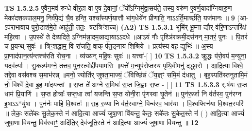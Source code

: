 \documentclass[17pt]{extarticle}
\begin{document}
                  \newline
                                \textbf{ TS 1.5.2.5} \newline
                  ए॒वैन॒मव॑ रुन्धे वीर॒हा वा ए॒ष दे॒वानां॒ ॅयो᳚ऽग्निमु॑द्वा॒सय॑ते॒ तस्य॒ वरु॑ण ए॒वर्ण॒यादा᳚ग्निवारु॒ण-मेका॑दशकपाल॒मनु॒ निर्व॑पे॒द्यं चै॒व हन्ति॒ यश्चा᳚स्यर्ण॒यात्तौ भा॑ग॒धेये॑न प्रीणाति॒ नाऽऽर्ति॒मार्च्छ॑ति॒ यज॑मानः ॥ \textbf{  9} \newline
                  \newline
                      (आ-ऽप॑राभावाय-पुरो॒डाश॑मे॒ते-आहु॑ती॒-ततः॒ -षटत्रिꣳ॑शच्च)  \textbf{(A2)} \newline \newline
                                        \textbf{ TS 1.5.3.1} \newline
                  भूमि॑र् भू॒म्ना द्यौर् व॑रि॒णाऽन्तरि॑क्षं महि॒त्वा । उ॒पस्थे॑ ते देव्यदिते॒ ऽग्निम॑न्ना॒दम॒न्नाद्या॒याऽऽद॑धे ॥आऽयं गौः पृश्ञि॑रक्रमी॒दस॑नन् मा॒तरं॒ पुनः॑ । पि॒तरं॑ च प्र॒यन्थ् सुवः॑ ॥ त्रिꣳ॒॒शद्धाम॒ वि रा॑जति॒ वाक् प॑त॒ङ्गाय॑ शिश्रिये । प्रत्य॑स्य वह॒ द्युभिः॑ ॥ अ॒स्य प्रा॒णाद॑पान॒त्य॑न्तश्च॑रति रोच॒ना । व्य॑ख्यन् महि॒षः सुवः॑ ॥ यत्त्वा᳚-[ ] \textbf{  10} \newline
                  \newline
                                \textbf{ TS 1.5.3.2} \newline
                  क्रु॒द्धः प॑रो॒वप॑ म॒न्युना॒ यदव॑र्त्या । सु॒कल्प॑मग्ने॒ तत्तव॒ पुन॒स्त्वोद्दी॑पयामसि ॥यत्ते॑ म॒न्युप॑रोप्तस्य पृथि॒वीमनु॑ दद्ध्व॒से । आ॒दि॒त्या विश्वे॒ तद्दे॒वा वस॑वश्च स॒माभ॑रन्न् ॥मनो॒ ज्योति॑र् जुषता॒माज्यं॒ ॅविच्छि॑न्नं ॅय॒ज्ञ्ꣳ समि॒मं द॑धातु । बृह॒स्पति॑स्तनुतामि॒मं नो॒ विश्वे॑ दे॒वा इ॒ह मा॑दयन्तां ॥ स॒प्त ते॑ अग्ने स॒मिधः॑ स॒प्त जि॒ह्वाः स॒प्त - [ ] \textbf{  11} \newline
                  \newline
                                \textbf{ TS 1.5.3.3} \newline
                  र्.ष॑यः स॒प्त धाम॑ प्रि॒याणि॑ । स॒प्त होत्राः᳚ सप्त॒धा त्वा॑ यजन्ति स॒प्त योनी॒रा पृ॑णस्वा घृ॒तेन॑ ॥ पुन॑रू॒र्जा नि व॑र्तस्व॒ पुन॑रग्न इ॒षाऽऽ*यु॑षा । पुन॑र्नः पाहि वि॒श्वतः॑ ॥ स॒ह र॒य्या नि व॑र्त॒स्वाग्ने॒ पिन्व॑स्व॒ धार॑या । वि॒श्वफ्स्नि॑या वि॒श्वत॒स्परि॑ ॥ लेकः॒ सले॑कः सु॒लेक॒स्ते न॑ आदि॒त्या आज्यं॑ जुषा॒णा वि॑यन्तु॒ केतः॒ सके॑तः सु॒केत॒स्ते न॑ ( ) आदि॒त्या आज्यं॑ जुषा॒णा वि॑यन्तु॒ विव॑स्वाꣳ॒॒ अदि॑ति॒र् देव॑जूति॒स्ते न॑ आदि॒त्या आज्यं॑ जुषा॒णा वि॑यन्तु ॥ \textbf{  12} \newline
                  \newline
\end{document}
